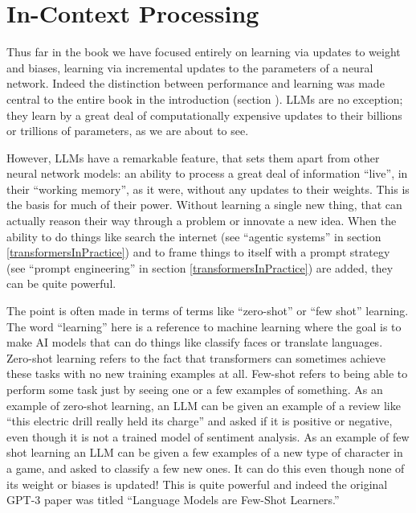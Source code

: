\section{In-Context Processing}\label{inContext}

Thus far in the book we have focused entirely on learning via updates to weight and biases, learning via incremental updates to the parameters of a neural network. Indeed the distinction between performance and learning was made central to the entire book in the introduction (section ). LLMs are no exception; they learn by a great deal of computationally expensive updates to their billions or trillions of parameters, as we are about to see. 

However, LLMs have a remarkable feature, that sets them apart from other neural network models: an ability to process a great deal of information ``live'', in their ``working memory'', as it were, without any updates to their weights. This is the basis for much of their power. Without learning a single new thing, that can actually reason their way through a problem or innovate a new idea. When the ability to do things like search the internet (see ``agentic systems'' in section \ref{transformersInPractice}) and to frame things to itself with a prompt strategy (see ``prompt engineering'' in section \ref{transformersInPractice}) are added, they can be quite powerful.

The point is often made in terms of terms like ``zero-shot'' or ``few shot'' learning. The word ``learning'' here is a reference to machine learning where the goal is to make AI models that can do things like classify faces or translate languages. Zero-shot learning refers to the fact that transformers can sometimes achieve these tasks with no new training examples at all.  Few-shot refers to being able to perform some task just by seeing one or a few examples of something.  As an example of zero-shot learning, an LLM can be given an example of a review like ``this electric drill really held its charge'' and asked if it is positive or negative, even though it is not a trained model of sentiment analysis.  As an example of few shot learning an LLM can be given a few examples of a new type of character in a game, and asked to classify a few new ones. It can do this even though none of its weight or biases is updated! This is quite powerful and indeed the original GPT-3 paper was titled ``Language Models are Few-Shot Learners.''  

